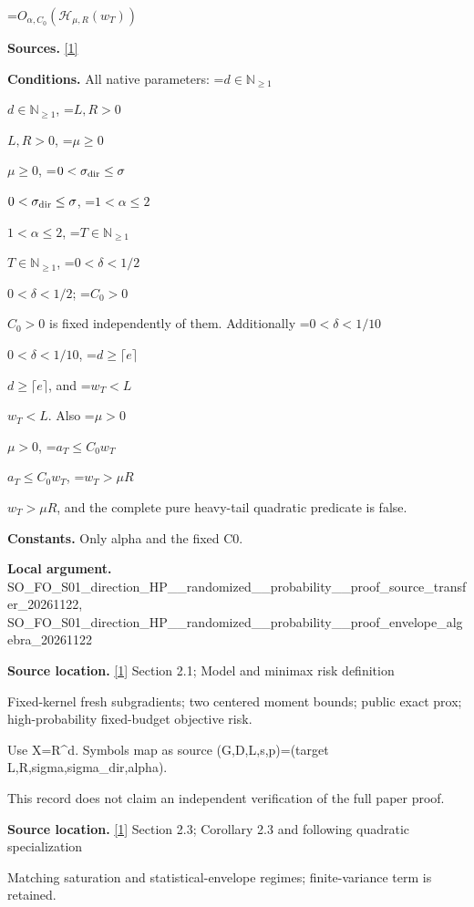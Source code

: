 \documentclass[10pt,a4paper]{article}
\newcommand{\AtlasMath}[1]{\par\begingroup\centering\setbox0=\hbox{$\displaystyle #1$}\ifdim\wd0>1.4\linewidth\typeout{ATLAS WIDE FORMULA: \the\wd0}\fi\ifdim\wd0>\linewidth\resizebox{\linewidth}{!}{\box0}\else\box0\fi\par\endgroup}
\newcommand{\AtlasInlineMath}[1]{\begingroup\setbox0=\hbox{$#1$}\ifdim\wd0>.4\linewidth\endgroup\AtlasMath{#1}\else\endgroup$#1$\fi}
\begin{document}
\AtlasMath{O_{\alpha,C_0}\!\left(\mathcal H_{\mu,R}(w_T)\right)}


\textbf{Sources.} \href{https://arxiv.org/html/2610.00260v2}{[1]}



\textbf{Conditions.} All native parameters: \AtlasInlineMath{d\in\mathbb N_{\ge1}}, \AtlasInlineMath{L,R>0}, \AtlasInlineMath{\mu\ge0}, \AtlasInlineMath{0<\sigma_{\rm dir}\le\sigma}, \AtlasInlineMath{1<\alpha\le2}, \AtlasInlineMath{T\in\mathbb N_{\ge1}}, \AtlasInlineMath{0<\delta<1/2}; \AtlasInlineMath{C_0>0} is fixed independently of them. Additionally \AtlasInlineMath{0<\delta<1/10}, \AtlasInlineMath{d\ge\lceil e\rceil}, and \AtlasInlineMath{w_T<L}. Also \AtlasInlineMath{\mu>0}, \AtlasInlineMath{a_T\le C_0w_T}, \AtlasInlineMath{w_T>\mu R}, and the complete pure heavy-tail quadratic predicate is false.



\textbf{Constants.} Only alpha and the fixed C0.



\textbf{Local argument.} SO\_FO\_S01\_direction\_HP\_\_\allowbreak{}randomized\_\_probability\_\allowbreak{}\_proof\_source\_transfer\_2\allowbreak{}0261122, SO\_FO\_S01\_direction\_HP\_\_\allowbreak{}randomized\_\_probability\_\allowbreak{}\_proof\_envelope\_algebra\_\allowbreak{}20261122



\textbf{Source location.} \href{https://arxiv.org/html/2610.00260v2}{[1]} Section 2.1; Model and minimax risk definition



Fixed-kernel fresh subgradients; two centered moment bounds; public exact prox; high-probability fixed-budget objective risk.



Use X=R\textasciicircum{}d. Symbols map as source (G,D,L,s,p)=(target L,R,sigma,sigma\_dir,alpha).



This record does not claim an independent verification of the full paper proof.



\textbf{Source location.} \href{https://arxiv.org/html/2610.00260v2}{[1]} Section 2.3; Corollary 2.3 and following quadratic specialization



Matching saturation and statistical-envelope regimes; finite-variance term is retained.
\end{document}
